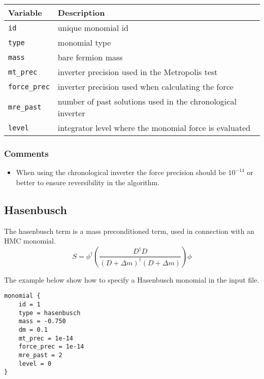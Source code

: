 \documentclass[12pt]{article}
\begin{document}
\vspace{2mm}

\begin{center}
\begin{tabular}{l|l}
 Variable & Description \\
 \hline
 \verb|id|         & unique monomial id \\
 \verb|type|       & monomial type \\
 \verb|mass|       & bare fermion mass \\
 \verb|mt_prec|    & inverter precision used in the Metropolis test \\
 \verb|force_prec| & inverter precision used when calculating the force \\
 \verb|mre_past|   & number of past solutions used in the chronological inverter \\
 \verb|level|      & integrator level where the monomial force is evaluated
\end{tabular}
\end{center}

\subsubsection*{Comments}
\begin{itemize}
 \item When using the chronological inverter the force precision should be $10^{-14}$ or better to ensure reversibility in the algorithm.
\end{itemize}

\newpage
\subsection*{Hasenbusch}
The hasenbusch term is a mass preconditioned term, used in connection with an HMC monomial.
\begin{equation}
 S = \phi^\dagger\left(\frac{D^\dagger D}{(D+\Delta m)^\dagger (D+\Delta m)}\right)\phi
\end{equation}

The example below show how to specify a Hasenbusch monomial in the input file.
\begin{center}
\begin{minipage}{55mm}
\begin{framed}
\begin{verbatim}
monomial {
    id = 1
    type = hasenbusch
    mass = -0.750
    dm = 0.1
    mt_prec = 1e-14
    force_prec = 1e-14
    mre_past = 2
    level = 0
}
\end{verbatim}
\vspace{-5mm}
\end{framed}
\end{minipage}
\end{center}
\end{document}
